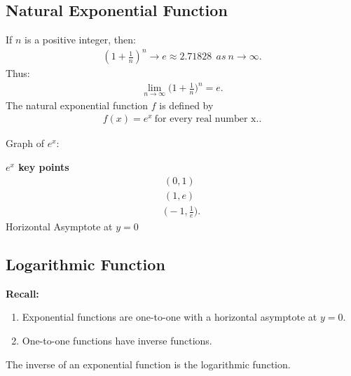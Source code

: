 \documentclass{report}
\begin{document}
      \pagebreak \bigbreak \noindent
      \subsection{Natural Exponential Function}

        \smallbreak \noindent
        \begin{definition}
        If $n$ is a positive integer, then:
        \begin{align*}
          \left(1 + \frac{1}{n}\right)^n \to e \approx 2.71828\ \ as\ n \to \infty
        .\end{align*}
        \bigbreak \noindent 
        Thus:
        \begin{align*}
          \lim\limits_{n \to \infty}{\bigg(1+\frac{1}{n}\bigg)^{n} = e}
        .\end{align*}
        \bigbreak \noindent \bigbreak \noindent 
        The natural exponential function $f$ is defined by 
        \begin{align*}
          f(x) = e^x\ \text{for every real number x.}
        .\end{align*}
          \end{definition}
        \bigbreak \noindent 
        Graph of $e^{x}$:

      \begin{figure}[ht]
          \centering
          \label{fig:ex}
      \end{figure}
      \begin{mdframed}
        \textbf{$e^{x}$ key points}
        \bigbreak \noindent 
        \begin{align*}
          (0,1) \\
          (1,e) \\
         \bigg(-1, \frac{1}{e}\bigg)
        .\end{align*}
        \bigbreak \noindent 
        Horizontal Asymptote at $y=0$
        \bigbreak \noindent 
      \end{mdframed}

      \pagebreak \bigbreak \noindent
      \subsection{Logarithmic Function}
      \bigbreak \noindent 
      \begin{mdframed}
        \textbf{Recall:}
        \begin{enumerate}
          \item Exponential functions are one-to-one with a horizontal asymptote at $y = 0$.
          \item One-to-one functions have inverse functions.
        \end{enumerate}
        \bigbreak \noindent 
        The inverse of an exponential function is the logarithmic function.
      \end{mdframed}
\end{document}
